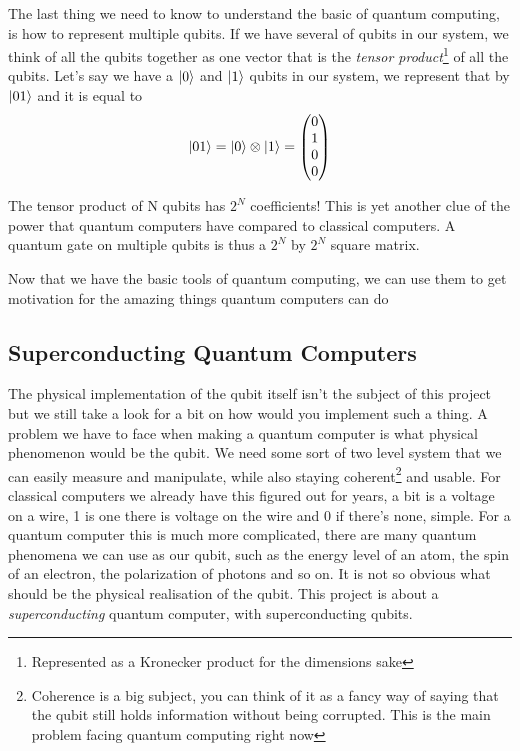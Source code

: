 The last thing we need to know to understand the basic of quantum computing, is how to represent multiple qubits. If we have several of qubits in our system, we think of all the qubits together as one vector that is the \textit{tensor product}\footnote{Represented as a Kronecker product for the dimensions sake} of all the qubits. Let's say we have a $\ket{0}$ and $\ket{1}$ qubits in our system, we represent that by $\ket{01}$ and it is equal to
\[\ket{01} = \ket{0} \otimes \ket{1} =
\begin{pmatrix}
    0 \\
    1 \\
    0 \\
    0
\end{pmatrix}\]

The tensor product of N qubits has $2^N$ coefficients! This is yet another clue of the power that quantum computers have compared to classical computers. A quantum gate on multiple qubits is thus a  $2^N$ by $2^N$ square matrix.

Now that we have the basic tools of quantum computing, we can use them to get motivation for the amazing things quantum computers can do

\subsection{Superconducting Quantum Computers}
The physical implementation of the qubit itself isn't the subject of this project but we still take a look for a bit on how would you implement such a thing. A problem we have to face when making a quantum computer is what physical phenomenon would be the qubit. We need some sort of two level system that we can easily measure and manipulate, while also staying coherent\footnote{Coherence is a big subject, you can think of it as a fancy way of saying that the qubit still holds information without being corrupted. This is the main problem facing quantum computing right now} and usable. For classical computers we already have this figured out for years, a bit is a voltage on a wire, 1 is one there is voltage on the wire and 0 if there's none, simple. For a quantum computer this is much more complicated, there are many quantum phenomena we can use as our qubit, such as the energy level of an atom, the spin of an electron, the polarization of photons and so on. It is not so obvious what should be the physical realisation of the qubit. This project is about a \textit{superconducting} quantum computer, with superconducting  qubits.

